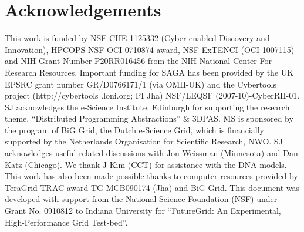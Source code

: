 \documentclass[conference,final]{IEEEtran}
\newcommand{\alnote}[1]{ {\textcolor{blue} { ***andreL: #1 }}}
\newcommand{\alnote}[1]{}
\newcommand{\up}{\vspace*{-1em}}
\newcommand{\upp}{\vspace*{-0.5em}}
\begin{document}


\up
\section*{Acknowledgements\upp\upp}
\footnotesize{This work is funded by NSF CHE-1125332 (Cyber-enabled
  Discovery and Innovation), HPCOPS NSF-OCI 0710874 award, NSF-ExTENCI
  (OCI-1007115) and NIH Grant Number P20RR016456 from the NIH National
  Center For Research Resources. Important funding for SAGA has been
  provided by the UK EPSRC grant number GR/D0766171/1 (via OMII-UK)
  and the Cybertools project (http://cybertools .loni.org; PI Jha)
  NSF/LEQSF (2007-10)-CyberRII-01. SJ acknowledges the e-Science
  Institute, Edinburgh for supporting the research
  theme. ``Distributed Programming Abstractions'' \& 3DPAS. MS is
  sponsored by the program of BiG Grid, the Dutch e-Science Grid,
  which is financially supported by the Netherlands Organisation for
  Scientific Research, NWO. SJ acknowledges useful related discussions
  with Jon Weissman (Minnesota) and Dan Katz (Chicago). We thank J Kim
  (CCT) for assistance with the DNA models.  This work has also been
  made possible thanks to computer resources provided by TeraGrid TRAC
  award TG-MCB090174 (Jha) and BiG Grid.  This document was developed with
  support from the National Science Foundation (NSF) under Grant No. 0910812
  to Indiana University for ``FutureGrid: An Experimental, High-Performance
  Grid Test-bed''.}  \up
%


\end{document}
